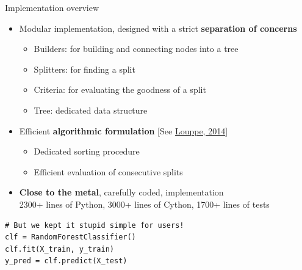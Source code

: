 \documentclass{beamer}
\begin{document}
\begin{frame}[fragile]{Implementation overview}

\begin{itemize}
\item Modular implementation, designed with a strict {\bf separation of concerns}
  \begin{itemize}
    \item Builders: for building and connecting nodes into a tree
    \item Splitters: for finding a split
    \item Criteria: for evaluating the goodness of a split
    \item Tree: dedicated data structure
  \end{itemize}
\item Efficient {\bf algorithmic formulation} [See \href{http://arxiv.org/abs/1407.7502}{Louppe, 2014}]\\
  \begin{itemize}
    \item Dedicated sorting procedure
    \item Efficient evaluation of consecutive splits
  \end{itemize}
\item {\bf Close to the metal}, carefully coded, implementation\\
  {\small 2300+ lines of Python, 3000+ lines of Cython, 1700+ lines of tests}

\end{itemize}

\vspace{0.1cm}

\begin{verbatim}
# But we kept it stupid simple for users!
clf = RandomForestClassifier()
clf.fit(X_train, y_train)
y_pred = clf.predict(X_test)
\end{verbatim}

\end{frame}
\end{document}

